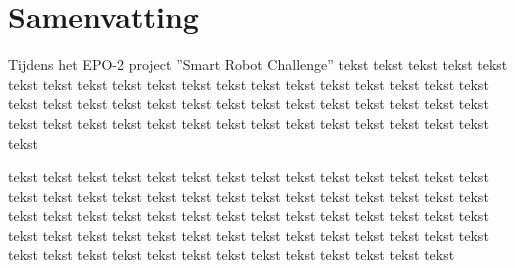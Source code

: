 \chapter{Samenvatting}

Tijdens het EPO-2 project ''Smart Robot Challenge'' tekst tekst tekst tekst tekst tekst tekst tekst tekst tekst tekst tekst 
tekst tekst tekst tekst tekst tekst tekst tekst tekst tekst tekst tekst tekst tekst tekst tekst tekst tekst tekst tekst tekst 
tekst tekst tekst tekst tekst tekst tekst tekst tekst tekst tekst tekst tekst tekst tekst 

tekst tekst tekst tekst tekst tekst tekst tekst tekst tekst tekst tekst tekst tekst tekst tekst tekst tekst tekst tekst tekst 
tekst tekst tekst tekst tekst tekst tekst tekst tekst tekst tekst tekst tekst tekst tekst tekst tekst tekst tekst tekst tekst 
tekst tekst tekst tekst tekst tekst tekst tekst tekst tekst tekst tekst tekst tekst tekst tekst tekst tekst tekst tekst tekst 
tekst tekst tekst tekst tekst tekst 